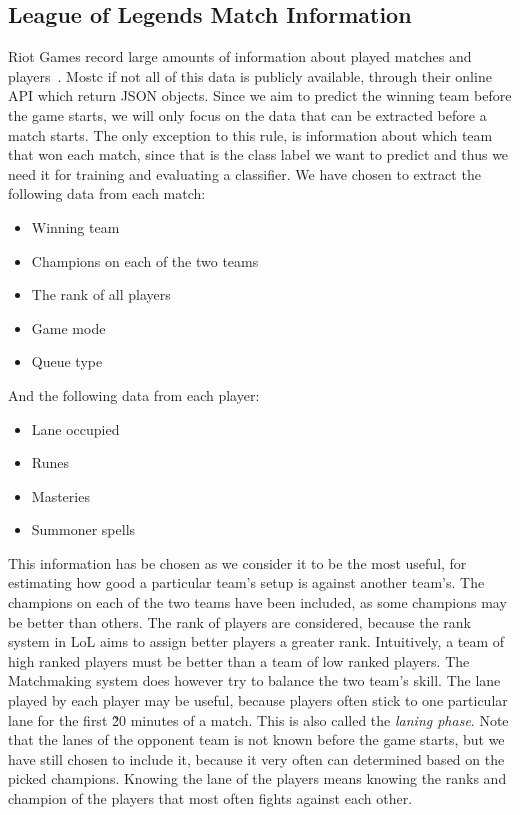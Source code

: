 \subsection{League of Legends Match Information}\label{sec:matchdata}
Riot Games record large amounts of information about played matches and players~\cite{matchinfo}. Mostc if not all of this data is publicly available, through their online API which return JSON objects. Since we aim to predict the winning team before the game starts, we will only focus on the data that can be extracted before a match starts. The only exception to this rule, is information about which team that won each match, since that is the class label we want to predict and thus we need it for training and evaluating a classifier.
We have chosen to extract the following data from each match:
\begin{itemize}
\item Winning team
\item Champions on each of the two teams
\item The rank of all players
\item Game mode
\item Queue type
\end{itemize}
And the following data from each player:
\begin{itemize}
\item Lane occupied 
\item Runes 
\item Masteries 
\item Summoner spells 
\end{itemize}
This information has be chosen as we consider it to be the most useful, for estimating how good a particular team's setup is against another team's. 
The champions on each of the two teams have been included, as some champions may be better than others.
The rank of players are considered, because the rank system in LoL aims to assign better players a greater rank. Intuitively, a team of high ranked players must be better than a team of low ranked players. The Matchmaking system does however try to balance the two team's skill.
The lane played by each player may be useful, because players often stick to one particular lane for the first \~20 minutes of a match. This is also called the \emph{laning phase}.
Note that the lanes of the opponent team is not known before the game starts, but we have still chosen to include it, because it very often can determined based on the picked champions. Knowing the lane of the players means knowing the ranks and champion of the players that most often fights against each other.
